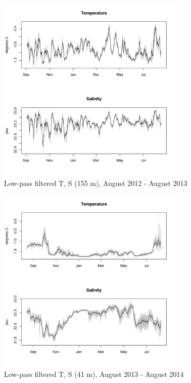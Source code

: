 \documentclass[12pt]{dforeport}
\begin{document}
\begin{figure}  
\centering
\includegraphics[width = 0.8\textwidth]{./figures/24_lpf_TS_155m_2012_2013.png}
\caption[Low-pass filtered T, S (155 m), 2012-2013]{Low-pass filtered T, S (155 m), August 2012 - August 2013}
\label{f:ctd_155_lpf_2012_2013}
\end{figure}


\begin{figure}  
\centering
\includegraphics[width = 0.8\textwidth]{./figures/25_lpf_TS_41m_2013_2014.png}
\caption[Low-pass filtered T, S (41 m), 2013-2014]{Low-pass filtered T, S (41 m), August 2013 - August 2014}
\label{f:ctd_41_lpf_2013_2014}
\end{figure}
\end{document}
